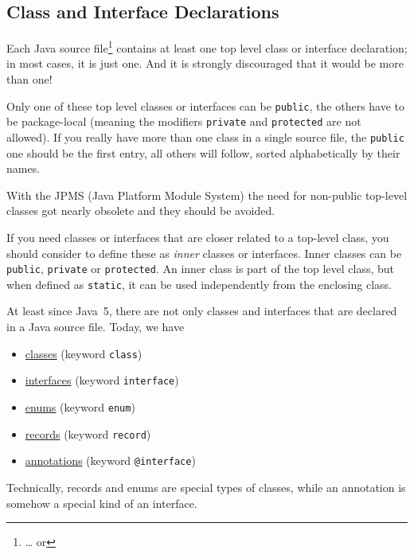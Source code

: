 \subsection{Class and Interface Declarations}\label{sec:ClassAndInterfaceDeclarations}
Each Java source file\footnote{… or } contains at least one top level class or interface declaration; in most cases, it is just one. And it is strongly discouraged that it would be more than one!

Only one of these top level classes or interfaces can be \lstinline|public|, the others have to be package-local (meaning the modifiers \lstinline|private| and \lstinline|protected| are not allowed). If you really have more than one class in a single source file, the \lstinline|public| one should be the first entry, all others will follow, sorted alphabetically by their names.

With the JPMS (Java Platform Module System) the need for non-public top-level classes got nearly obsolete and they should be avoided.

If you need classes or interfaces that are closer related to a top-level class, you should consider to define these as \textit{inner} classes or interfaces. Inner classes can be \lstinline|public|, \lstinline|private| or \lstinline|protected|. An inner class is part of the top level class, but when defined as \lstinline|static|, it can be used independently from the enclosing class.

At least since Java~5, there are not only classes and interfaces that are declared in a Java source file. Today, we have

\begin{itemize}[nosep]
\item{\hyperref[subsec:Class]{classes} (keyword \lstinline|class|)}
\item{\hyperref[subsec:Interface]{interfaces} (keyword \lstinline|interface|)}
\item{\hyperref[subsec:Enum]{enums} (keyword \lstinline|enum|)}
\item{\hyperref[subsec:Record]{records} (keyword \lstinline|record|)}
\item{\hyperref[subsec:Annotation]{annotations} (keyword \lstinline|@interface|)}
\end{itemize}

Technically, records and enums are special types of classes, while an annotation is somehow a special kind of an interface.

